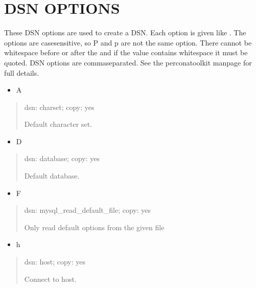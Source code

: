 \documentclass[letterpaper,10pt,english]{sphinxmanual}
\begin{document}
\section{DSN OPTIONS}
\label{\detokenize{mariadb-index-checker:dsn-options}}
\sphinxAtStartPar
These DSN options are used to create a DSN.  Each option is given like
.  The options are case\sphinxhyphen{}sensitive, so P and p are not the
same option.  There cannot be whitespace before or after the \sphinxcode{\sphinxupquote{=}} and
if the value contains whitespace it must be quoted.  DSN options are
comma\sphinxhyphen{}separated.  See the percona\sphinxhyphen{}toolkit manpage for full details.
\begin{itemize}
\item {} 
\sphinxAtStartPar
A

\end{itemize}
\begin{quote}

\sphinxAtStartPar
dsn: charset; copy: yes

\sphinxAtStartPar
Default character set.
\end{quote}
\begin{itemize}
\item {} 
\sphinxAtStartPar
D

\end{itemize}
\begin{quote}

\sphinxAtStartPar
dsn: database; copy: yes

\sphinxAtStartPar
Default database.
\end{quote}
\begin{itemize}
\item {} 
\sphinxAtStartPar
F

\end{itemize}
\begin{quote}

\sphinxAtStartPar
dsn: mysql\_read\_default\_file; copy: yes

\sphinxAtStartPar
Only read default options from the given file
\end{quote}
\begin{itemize}
\item {} 
\sphinxAtStartPar
h

\end{itemize}
\begin{quote}

\sphinxAtStartPar
dsn: host; copy: yes

\sphinxAtStartPar
Connect to host.
\end{quote}
\end{document}
